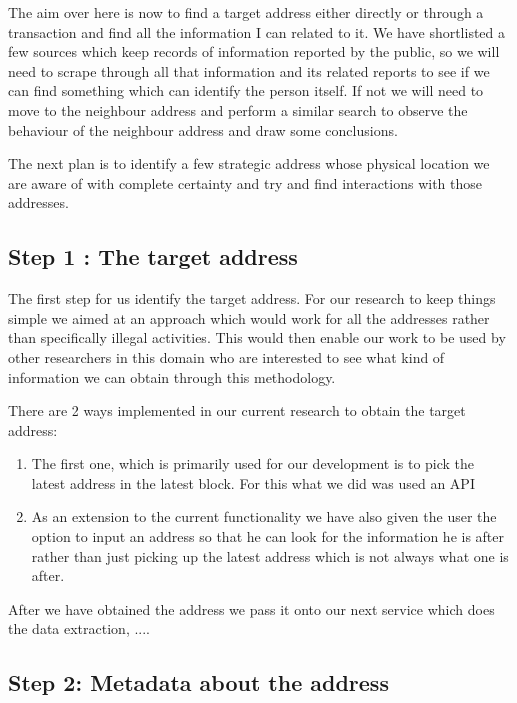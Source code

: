 \documentclass{article}
\begin{document}
    The aim over here is now to find a target address either directly or through a transaction and find all the information I can related to it. We have shortlisted a few sources which keep records of information reported by the public, so we will need to scrape through all that information and its related reports to see if we can find something which can identify the person itself. If not we will need to move to the neighbour address and perform a similar search to observe the behaviour of the neighbour address and draw some conclusions. 
    
    The next plan is to identify a few strategic address whose physical location we are aware of with complete certainty and try and find interactions with those addresses. 
    
    \subsection{Step 1 : The target address}
        The first step for us identify the target address. For our research to keep things simple we aimed at an approach which would work for all the addresses rather than specifically illegal activities. This would then enable our work to be used by other researchers in this domain who are interested to see what kind of information we can obtain through this methodology. 
        
        There are 2 ways implemented in our current research to obtain the target address: 
        \begin{enumerate}
            \item The first one, which is primarily used for our development is to pick the latest address in the latest block. 
            For this what we did was used an API 
            
            \item As an extension to the current functionality we have also given the user the option to input an address so that he can look for the information he is after rather than just picking up the latest address which is not always what one is after. 
        
        \end{enumerate}
        
        After we have obtained the address we pass it onto our next service which does the data extraction, ....
        
        
    \subsection{Step 2: Metadata about the address}
    
\end{document}

